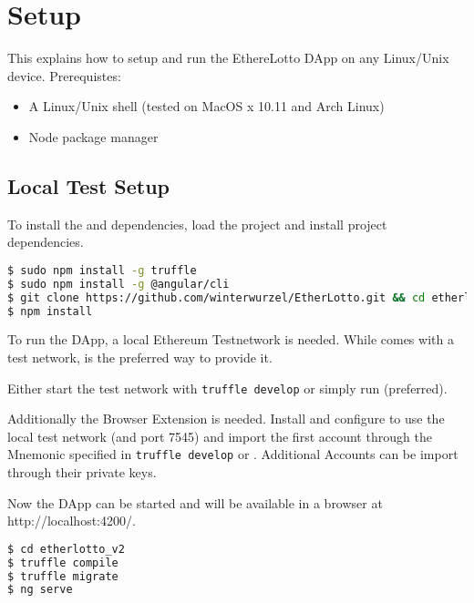 \chapter{Setup}\label{chap:setup}
\chapterstart

This explains how to setup and run the EthereLotto \ac{DApp} on any Linux/Unix device.
Prerequistes:
\begin{itemize}
    \item A Linux/Unix shell (tested on MacOS x 10.11 and Arch Linux)
    \item Node package manager 
\end{itemize}

\section{Local Test Setup}\label{sec:local}

To install the  and  dependencies, load the project and install project dependencies.
\begin{lstlisting}[language=bash]
$ sudo npm install -g truffle
$ sudo npm install -g @angular/cli
$ git clone https://github.com/winterwurzel/EtherLotto.git && cd etherlotto_v2
$ npm install
\end{lstlisting}

To run the \ac{DApp}, a local Ethereum Testnetwork is needed. While  comes with a test network,  is the preferred way to provide it.

Either start the  test network with \lstinline{truffle develop} or simply run  (preferred).

Additionally the Browser Extension  is needed.
Install and configure  to use the local test network (and port 7545) and import the first account through the Mnemonic specified in \lstinline{truffle develop} or .
Additional Accounts can be import through their private keys. 

Now the \ac{DApp} can be started and will be available in a browser at http://localhost:4200/.
\begin{lstlisting}[language=bash]
$ cd etherlotto_v2
$ truffle compile
$ truffle migrate
$ ng serve
\end{lstlisting}


\chapterend

